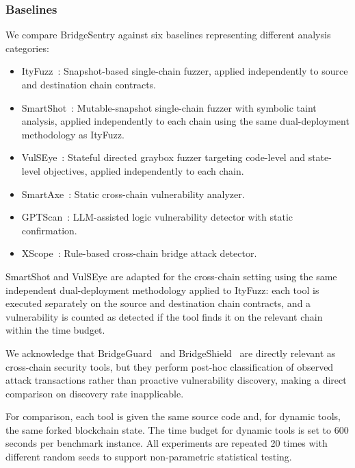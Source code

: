 \documentclass[journal]{IEEEtran}
\begin{document}
\subsubsection{Baselines}

We compare BridgeSentry against six baselines representing different analysis categories:

\begin{itemize}
    \item ItyFuzz~\cite{shou2023ityfuzz}: Snapshot-based single-chain fuzzer, applied independently to source and destination chain contracts.
    \item SmartShot~\cite{liang2025smartshot}: Mutable-snapshot single-chain fuzzer with symbolic taint analysis, applied independently to each chain using the same dual-deployment methodology as ItyFuzz.
    \item VulSEye~\cite{liang2025vulseye}: Stateful directed graybox fuzzer targeting code-level and state-level objectives, applied independently to each chain.
    \item SmartAxe~\cite{liao2024smartaxe}: Static cross-chain vulnerability analyzer.
    \item GPTScan~\cite{sun2024gptscan}: LLM-assisted logic vulnerability detector with static confirmation.
    \item XScope~\cite{zhang2022xscope}: Rule-based cross-chain bridge attack detector.
\end{itemize}

SmartShot and VulSEye are adapted for the cross-chain setting using the same independent dual-deployment methodology applied to ItyFuzz: each tool is executed separately on the source and destination chain contracts, and a vulnerability is counted as detected if the tool finds it on the relevant chain within the time budget.

We acknowledge that BridgeGuard~\cite{zhou2025bridgeguard} and BridgeShield~\cite{lin2025bridgeshield} are directly relevant as cross-chain security tools, but they perform post-hoc classification of observed attack transactions rather than proactive vulnerability discovery, making a direct comparison on discovery rate inapplicable.

For comparison, each tool is given the same source code and, for dynamic tools, the same forked blockchain state. The time budget for dynamic tools is set to 600 seconds per benchmark instance. All experiments are repeated 20 times with different random seeds to support non-parametric statistical testing.
\end{document}
